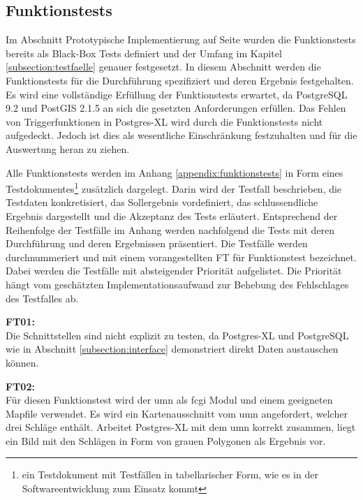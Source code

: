 \subsection{Funktionstests}
Im Abschnitt Prototypische Implementierung auf Seite \pageref{grundlagen-funktionstests} wurden die Funktionstests bereits als Black-Box Tests definiert und der Umfang im Kapitel \ref{subsection:testfaelle} genauer festgesetzt.
In diesem Abschnitt werden die Funktionstests für die Durchführung spezifiziert und deren Ergebnis festgehalten.
Es wird eine vollständige Erfüllung der Funktionstests erwartet, da PostgreSQL 9.2 und PostGIS 2.1.5 an sich die gesetzten Anforderungen erfüllen.
Das Fehlen von Triggerfunktionen in Postgres-XL wird durch die Funktionstests nicht aufgedeckt.
Jedoch ist dies als wesentliche Einschränkung festzuhalten und für die Auswertung heran zu ziehen.

Alle Funktionstests werden im Anhang \ref{appendix:funktionstests} in Form eines Testdokumentes\footnote{ein Testdokument mit Testfällen in tabellarischer Form, wie es in der Softwareentwicklung zum Einsatz kommt} zusätzlich dargelegt.
Darin wird der Testfall beschrieben, die Testdaten konkretisiert, das Sollergebnis vordefiniert, das schlussendliche Ergebnis dargestellt und die Akzeptanz des Tests erläutert.
Entsprechend der Reihenfolge der Testfälle im Anhang werden nachfolgend die Tests mit deren Durchführung und deren Ergebnissen präsentiert.
Die Testfälle werden durchnummeriert und mit einem vorangestellten FT für Funktionstest bezeichnet.
Dabei werden die Testfälle mit absteigender Priorität aufgelistet.
Die Priorität hängt vom geschätzten Implementationsaufwand zur Behebung des Fehlschlages des Testfalles ab.

\textbf{FT01:}\\
Die Schnittstellen sind nicht explizit zu testen, da Postgres-XL und PostgreSQL wie in Abschnitt \ref{subsection:interface} demonstriert direkt Daten austauschen können.

\textbf{FT02:}\\
Für diesen Funktionstest wird der \Gls{umn} als \Gls{fcgi} Modul und einem geeigneten Mapfile verwendet.
Es wird ein Kartenausschnitt vom \Gls{umn} angefordert, welcher drei Schläge enthält.
Arbeitet Postgres-XL mit dem \Gls{umn} korrekt zusammen, liegt ein Bild mit den Schlägen in Form von  grauen Polygonen als Ergebnis vor.

